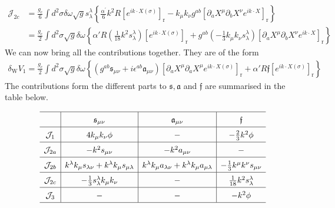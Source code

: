 \begin{tcolorbox}[breakable]
\begin{align}
			\mathcal{J}_{2 c} &= \frac{g_c}{6} \int d^2 \sigma \delta \omega \sqrt{g} s_\lambda^\lambda\left\{\frac{\alpha^{\prime}}{6} k^2 R\left[e^{i k \cdot X(\sigma)}\right]_{\mathrm{r}} - k_\mu k_\nu g^{a b}\left[\partial_a X^\mu \partial_b X^\nu e^{i k \cdot X}\right]_{\mathrm{r}}\right\} \nonumber \\
			&= \frac{g_c}{2} \int d^2 \sigma \sqrt{g} \delta \omega\left\{\alpha' R\left(\frac{1}{18} k^2 s_\lambda^\lambda\right)\left[e^{i k \cdot X(\sigma)}\right]_{\mathrm{r}} + g^{a b}\left(-\frac{1}{3} k_\mu k_\nu s_\lambda^\lambda\right)\left[\partial_a X^\mu \partial_b X^\nu e^{i k \cdot X}\right]_{\mathrm{r}}\right\}
		\end{align}
		We can now bring all the contributions together. They are of the form
		\begin{align}
			\delta_{\mathrm{W}} V_1 = \frac{g_c}{2} \int d^2 \sigma \sqrt{g} \delta \omega\left\{\left(g^{a b} \mathfrak{s}_{\mu \nu}+i \epsilon^{a b} \mathfrak{a}_{\mu \nu}\right)\left[\partial_a X^\mu \partial_a X^\mu e^{i k \cdot X(\sigma)}\right]_{\mathrm{r}} + \alpha' R \mathfrak{f}\left[e^{i k \cdot X(\sigma)}\right]_{\mathrm{r}}\right\}
		\end{align}
		The contributions form the different parts to $\mathfrak{s}, \mathfrak{a}$ and $\mathfrak{f}$ are summarised in the table below.
		
		\begin{align}
			\begingroup
			\renewcommand{\arraystretch}{1.5}
			\begin{array}{c|c|c|c}
				\hline
				& \mathfrak{s}_{\mu \nu} & \mathfrak{a}_{\mu \nu} & \mathfrak{f} \\ \hline
				\mathcal{J}_1 & 4 k_\mu k_\nu \phi & - & -\frac{2}{3} k^2 \phi \\ \hline
				\mathcal{J}_{2 a} & -k^2 s_{\mu \nu} & -k^2 a_{\mu \nu} & - \\ \hline
				\mathcal{J}_{2 b} & k^\lambda k_\mu s_{\lambda \nu} + k^\lambda k_\mu s_{\mu \lambda} & k^\lambda k_\mu a_{\lambda \nu} + k^\lambda k_\mu a_{\mu \lambda} & -\frac{1}{3} k^\mu k^\nu s_{\mu \nu} \\ \hline
				\mathcal{J}_{2 c} & -\frac{1}{3} s_\lambda^\lambda k_\mu k_\nu & - & \frac{1}{18} k^2 s_\lambda^\lambda \\ \hline
				\mathcal{J}_3 & - & - & -k^2 \phi \\ \hline
			\end{array}
			\endgroup
		\end{align}
		

\end{tcolorbox}
